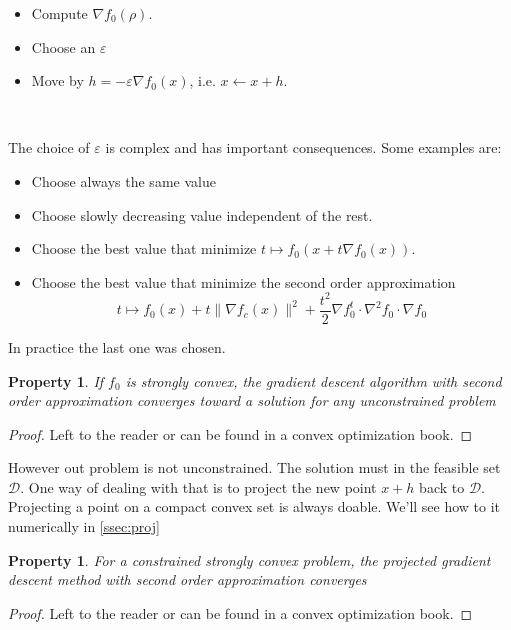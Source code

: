 \documentclass[10pt,a4paper]{report}
\theoremstyle{plain}
\newtheorem{prop}[thm]{Property}
\theoremstyle{definition}
\theoremstyle{remark}
\newcommand{\TODO}{\textbf{TODO}}
\begin{document}
\begin{itemize}
\item Compute $\nabla f_0(\rho)$.
\item Choose an $\varepsilon$
\item Move by $h = -\varepsilon \nabla f_0(x)$, i.e. $x \leftarrow x + h$.
\end{itemize}

\

\noindent The choice of $\varepsilon$ is complex and has important consequences.
Some examples are:
\begin{itemize}
\item Choose always the same value
\item Choose slowly decreasing value independent of the rest.
\item Choose the best value that minimize $t \mapsto f_0(x + t\nabla f_0(x))$.
\item Choose the best value that minimize the second order approximation
  \[t \mapsto f_0(x) + t\|\nabla f_c(x)\|^2 + \frac {t^2} 2 \nabla f_0^t \cdot
  \nabla^2\!f_0 \cdot \nabla f_0\]
\end{itemize}

In practice the last one was chosen.
\begin{prop}
  If $f_0$ is strongly convex,
  the gradient descent algorithm with second order approximation converges
  toward a solution for any unconstrained problem
\end{prop}

\begin{proof}
  Left to the reader or can be found in a convex optimization book.
\end{proof}

However out problem is not unconstrained. The solution must in the feasible set
$\mathcal{D}$. One way of dealing with that is to project the new point $x + h$
back to $\mathcal{D}$. Projecting a point on a compact convex set is always
doable. We'll see how to it numerically in \cref{ssec:proj}

\begin{prop}
  For a constrained strongly convex problem, the projected gradient descent
  method with second order approximation converges
\end{prop}

\begin{proof}
  Left to the reader or can be found in a convex optimization book.
\end{proof}
\end{document}
